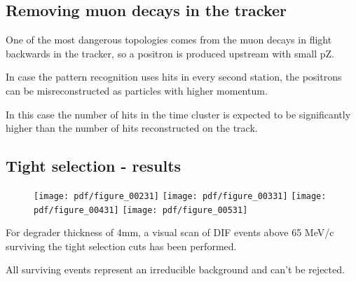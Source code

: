 \subsection{Removing muon decays in the tracker}

One of the most dangerous topologies comes from the muon decays in flight backwards in the tracker,
so a positron is produced upstream with small pZ.

In case the pattern recognition uses hits in every second station, the positrons can be misreconstructed
as particles with higher momentum.

In this case the number of hits in the time cluster is expected to be significantly higher
than the number of hits reconstructed on the track.

\subsection{Tight selection - results}


\begin{figure}[H]
  \texttt{[image: pdf/figure\_00231]}
  \texttt{[image: pdf/figure\_00331]}
  \texttt{[image: pdf/figure\_00431]}
  \texttt{[image: pdf/figure\_00531]}
  \caption{
    \label{fig:deg_3mm_mom}
  }
\end{figure}

For degrader thickness of 4mm, a visual scan of DIF events above 65 MeV/c surviving
the tight selection cuts has been performed.

All surviving events represent an irreducible background and can't be rejected.

